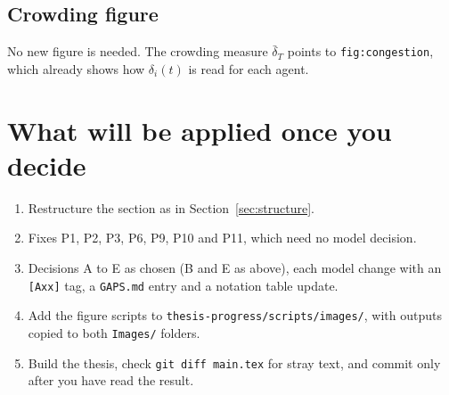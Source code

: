 \documentclass[11pt,a4paper]{article}
\begin{document}
\subsection{Crowding figure}

No new figure is needed. The crowding measure $\bar\delta_T$ points to
\texttt{fig:congestion}, which already shows how $\delta_i(t)$ is read for
each agent.

\section{What will be applied once you decide}

\begin{enumerate}[nosep]
  \item Restructure the section as in Section~\ref{sec:structure}.
  \item Fixes P1, P2, P3, P6, P9, P10 and P11, which need no model
    decision.
  \item Decisions A to E as chosen (B and E as above), each model change with an
    \texttt{[Axx]} tag, a \texttt{GAPS.md} entry and a notation table
    update.
  \item Add the figure scripts to \texttt{thesis-progress/scripts/images/},
    with outputs copied to both \texttt{Images/} folders.
  \item Build the thesis, check \texttt{git diff main.tex} for stray
    text, and commit only after you have read the result.
\end{enumerate}
\end{document}
